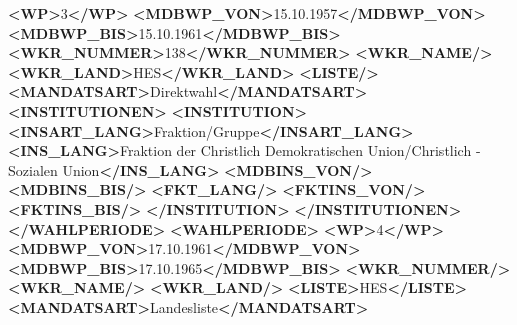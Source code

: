 \documentclass[12pt]{article}
\newenvironment{Shaded}{\begin{snugshade}}{\end{snugshade}}
\newcommand{\KeywordTok}[1]{\textcolor[rgb]{0.13,0.29,0.53}{\textbf{#1}}}
\newcommand{\NormalTok}[1]{#1}
\begin{document}
{\begin{Shaded}
\begin{Highlighting}[]
        \KeywordTok{\textless{}WP\textgreater{}}\NormalTok{3}\KeywordTok{\textless{}/WP\textgreater{}}
        \KeywordTok{\textless{}MDBWP\_VON\textgreater{}}\NormalTok{15.10.1957}\KeywordTok{\textless{}/MDBWP\_VON\textgreater{}}
        \KeywordTok{\textless{}MDBWP\_BIS\textgreater{}}\NormalTok{15.10.1961}\KeywordTok{\textless{}/MDBWP\_BIS\textgreater{}}
        \KeywordTok{\textless{}WKR\_NUMMER\textgreater{}}\NormalTok{138}\KeywordTok{\textless{}/WKR\_NUMMER\textgreater{}}
        \KeywordTok{\textless{}WKR\_NAME/\textgreater{}}
        \KeywordTok{\textless{}WKR\_LAND\textgreater{}}\NormalTok{HES}\KeywordTok{\textless{}/WKR\_LAND\textgreater{}}
        \KeywordTok{\textless{}LISTE/\textgreater{}}
        \KeywordTok{\textless{}MANDATSART\textgreater{}}\NormalTok{Direktwahl}\KeywordTok{\textless{}/MANDATSART\textgreater{}}
        \KeywordTok{\textless{}INSTITUTIONEN\textgreater{}}
          \KeywordTok{\textless{}INSTITUTION\textgreater{}}
            \KeywordTok{\textless{}INSART\_LANG\textgreater{}}\NormalTok{Fraktion/Gruppe}\KeywordTok{\textless{}/INSART\_LANG\textgreater{}}
            \KeywordTok{\textless{}INS\_LANG\textgreater{}}\NormalTok{Fraktion der Christlich Demokratischen Union/Christlich {-} Sozialen Union}\KeywordTok{\textless{}/INS\_LANG\textgreater{}}
            \KeywordTok{\textless{}MDBINS\_VON/\textgreater{}}
            \KeywordTok{\textless{}MDBINS\_BIS/\textgreater{}}
            \KeywordTok{\textless{}FKT\_LANG/\textgreater{}}
            \KeywordTok{\textless{}FKTINS\_VON/\textgreater{}}
            \KeywordTok{\textless{}FKTINS\_BIS/\textgreater{}}
          \KeywordTok{\textless{}/INSTITUTION\textgreater{}}
        \KeywordTok{\textless{}/INSTITUTIONEN\textgreater{}}
      \KeywordTok{\textless{}/WAHLPERIODE\textgreater{}}
      \KeywordTok{\textless{}WAHLPERIODE\textgreater{}}
        \KeywordTok{\textless{}WP\textgreater{}}\NormalTok{4}\KeywordTok{\textless{}/WP\textgreater{}}
        \KeywordTok{\textless{}MDBWP\_VON\textgreater{}}\NormalTok{17.10.1961}\KeywordTok{\textless{}/MDBWP\_VON\textgreater{}}
        \KeywordTok{\textless{}MDBWP\_BIS\textgreater{}}\NormalTok{17.10.1965}\KeywordTok{\textless{}/MDBWP\_BIS\textgreater{}}
        \KeywordTok{\textless{}WKR\_NUMMER/\textgreater{}}
        \KeywordTok{\textless{}WKR\_NAME/\textgreater{}}
        \KeywordTok{\textless{}WKR\_LAND/\textgreater{}}
        \KeywordTok{\textless{}LISTE\textgreater{}}\NormalTok{HES}\KeywordTok{\textless{}/LISTE\textgreater{}}
        \KeywordTok{\textless{}MANDATSART\textgreater{}}\NormalTok{Landesliste}\KeywordTok{\textless{}/MANDATSART\textgreater{}}

\end{Highlighting}
\end{Shaded}}
\end{document}
